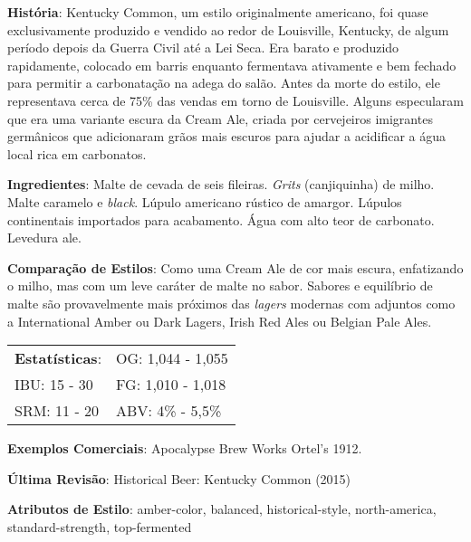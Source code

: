\textbf{História}: Kentucky Common, um estilo originalmente americano, foi quase exclusivamente produzido e vendido ao redor de Louisville, Kentucky, de algum período depois da Guerra Civil até a Lei Seca. Era barato e produzido rapidamente, colocado em barris enquanto fermentava ativamente e bem fechado para permitir a carbonatação na adega do salão. Antes da morte do estilo, ele representava cerca de 75\% das vendas em torno de Louisville. Alguns especularam que era uma variante escura da Cream Ale, criada por cervejeiros imigrantes germânicos que adicionaram grãos mais escuros para ajudar a acidificar a água local rica em carbonatos.

\textbf{Ingredientes}: Malte de cevada de seis fileiras. \textit{Grits} (canjiquinha) de milho. Malte caramelo e \textit{black}. Lúpulo americano rústico de amargor. Lúpulos continentais importados para acabamento. Água com alto teor de carbonato. Levedura ale.

\textbf{Comparação de Estilos}: Como uma Cream Ale de cor mais escura, enfatizando o milho, mas com um leve caráter de malte no sabor. Sabores e equilíbrio de malte são provavelmente mais próximos das \textit{lagers} modernas com adjuntos como a International Amber ou Dark Lagers, Irish Red Ales ou Belgian Pale Ales.

\begin{tabular}{@{}p{35mm}p{35mm}@{}}
  \textbf{Estatísticas}: & OG: 1,044 - 1,055  \\
  IBU: 15 - 30  & FG: 1,010 - 1,018  \\
  SRM: 11 - 20 & ABV: 4\% - 5,5\%
\end{tabular}

\textbf{Exemplos Comerciais}: Apocalypse Brew Works Ortel's 1912.

\textbf{Última Revisão}: Historical Beer: Kentucky Common (2015)

\textbf{Atributos de Estilo}: amber-color, balanced, historical-style, north-america, standard-strength, top-fermented
